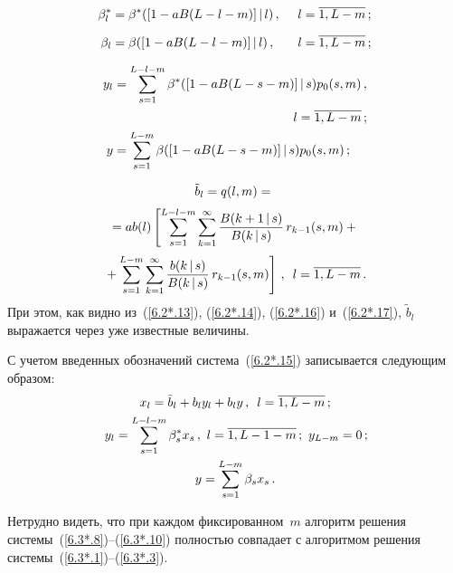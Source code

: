 \begin{multicols}{2}
\vspace*{-3pt}

\pagebreak

\noindent
\begin{alignat*}{2}
\beta^*_l&=\beta^*([1 - a B(L-l-m)]\,|\,l)\,,&\enskip l&=\overline{1,L-m}\,;
\\[6pt]
\beta_l&=\beta([1 - a B(L-l-m)]\,|\,l)\,,&\enskip l&=\overline{1,L-m}\,;
\end{alignat*}

\vspace*{-12pt}

\noindent
\begin{align*}
y_l&=\sum\limits_{s=1}^{L-l-m}\beta^*([1 - a B(L-s-m)]\,|\,s)
p_{0}(s,m)\,,\\[1pt]
&\hspace*{50mm}l=\overline{1,L-m}\,;\\
y&=\sum\limits_{s=1}^{L-m}\beta([1 - a B(L-s-m)]\,|\,s)p_{0}(s,m)\,;
\end{align*}

\vspace*{-12pt}

\noindent
\begin{multline*}
\tilde b_l=q(l,m)={}\\[2pt]
{}=a b(l)\left[\sum\limits_{s=1}^{L-l-m}
\sum\limits_{k=1}^\infty\displaystyle\frac{\displaystyle B(k+1\,|\,s) \mathstrut}{\displaystyle B(k\,|\,s)\mathstrut}\,
r_{k-1}(s,m) +
{}\right.\\[2pt]
\left.{}+
\sum\limits_{s=1}^{L-m} \sum\limits_{k=1}^\infty
\displaystyle\frac{\displaystyle b(k\,|\,s)\mathstrut}{\displaystyle  B(k\,|\,s)\mathstrut}\,
r_{k-1}(s,m)
\right]\,,\enskip l=\overline{1,L-m}\,.
\end{multline*}
При этом, как видно из~(\ref{6.2*.13}), (\ref{6.2*.14}),
(\ref{6.2*.16}) и~(\ref{6.2*.17}), $\tilde b_l$
выражается через уже известные величины.

С учетом введенных обозначений
сис\-те\-ма~(\ref{6.2*.15}) записывается сле\-ду\-ющим об\-разом:
\begin{gather}
\label{6.3*.8}
x_{l}= \tilde b_l + b_l y_l + b_l y \,,\enskip l=\overline{1,L-m}\,;
\\
\!y_l = \sum\limits_{s=1}^{L-l-m} \beta^*_s x_s\,,\
l=\overline{1,L-1-m}\,;\  y_{L-m} = 0\,;\!\!
\label{6.3*.9}
\\
\label{6.3*.10}
y= \sum\limits_{s=1}^{L-m} \beta_s x_s \,.
\end{gather}

Нетрудно видеть, что при каждом фиксированном~$m$
алгоритм решения сис\-те\-мы~(\ref{6.3*.8})--(\ref{6.3*.10})
полностью совпадает с алгоритмом решения сис\-те\-мы~(\ref{6.3*.1})--(\ref{6.3*.3}).


\end{multicols}
